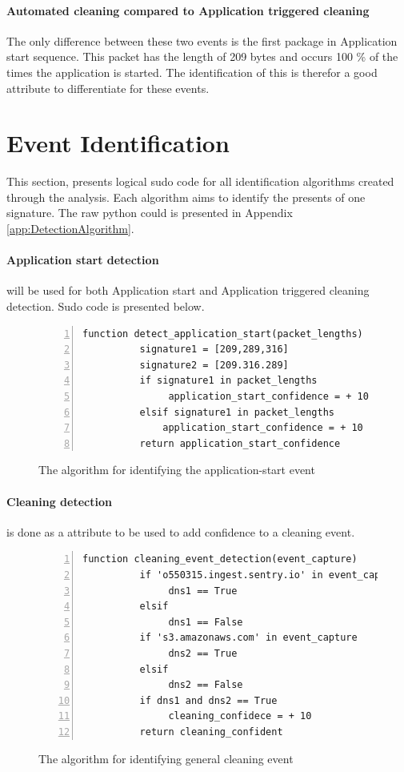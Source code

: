 \paragraph{Automated cleaning compared to Application triggered cleaning}
The only difference between these two events is the first package in Application start sequence. This packet has the length of 209 bytes and occurs 100 \% of the times the application is started. The identification of this is therefor a good attribute to differentiate for these events.

\section{Event Identification}
This section, presents logical sudo code  for all identification algorithms created through the analysis. Each algorithm aims to identify the presents of one signature. The raw python could is presented in Appendix \ref{app:DetectionAlgorithm}. 

\paragraph{Application start detection} will be used for both Application start and Application triggered cleaning detection. Sudo code is presented below.

\begin{figure}[H]
    \centering
    \caption{The algorithm for identifying the application-start event}
    \label{fig:Sudo_code_application start}
    \begin{lstlisting}[numbers=left]
     function detect_application_start(packet_lengths)
          signature1 = [209,289,316]
          signature2 = [209.316.289]
          if signature1 in packet_lengths
               application_start_confidence = + 10
          elsif signature1 in packet_lengths
              application_start_confidence = + 10
          return application_start_confidence
    \end{lstlisting}
\end{figure}

\paragraph{Cleaning detection} is done as a attribute to be used to add confidence to a cleaning event. 
\begin{figure}[H]
    \centering
    \caption{The algorithm for identifying general cleaning event}
    \label{fig:Sudo_code_cleaning_event}
    \begin{lstlisting}[numbers=left]
     function cleaning_event_detection(event_capture)
          if 'o550315.ingest.sentry.io' in event_capture
               dns1 == True
          elsif
               dns1 == False
          if 's3.amazonaws.com' in event_capture
               dns2 == True
          elsif
               dns2 == False
          if dns1 and dns2 == True      
               cleaning_confidece = + 10
          return cleaning_confident
    \end{lstlisting}
\end{figure}

